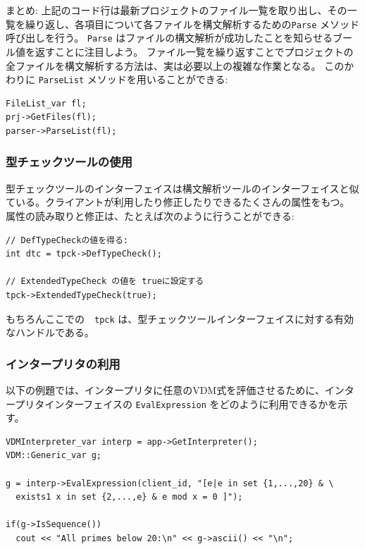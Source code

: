 \documentclass[\pformat,12pt]{jarticle}
\begin{document}
まとめ: 上記のコード行は最新プロジェクトのファイル一覧を取り出し、その一覧を繰り返し、各項目について各ファイルを構文解析するための{\tt Parse} メソッド呼び出しを行う。
 {\tt Parse} はファイルの構文解析が成功したことを知らせるブール値を返すことに注目しよう。
ファイル一覧を繰り返すことでプロジェクトの全ファイルを構文解析する方法は、実は必要以上の複雑な作業となる。
このかわりに {\tt ParseList} メソッドを用いることができる:

\begin{verbatim}
FileList_var fl;
prj->GetFiles(fl);
parser->ParseList(fl);
\end{verbatim}

\subsubsection{型チェックツールの使用}
\label{usingthetypechecker}

型チェックツールのインターフェイスは構文解析ツールのインターフェイスと似ている。クライアントが利用したり修正したりできるたくさんの属性をもつ。 
属性の読み取りと修正は、たとえば次のように行うことができる: 

\begin{verbatim}
// DefTypeCheckの値を得る:
int dtc = tpck->DefTypeCheck();

// ExtendedTypeCheck の値を trueに設定する
tpck->ExtendedTypeCheck(true);
\end{verbatim}

もちろんここでの　\texttt{tpck} は、型チェックツールインターフェイスに対する有効なハンドルである。

\subsubsection{インタープリタの利用}\label{cpp:interp}
\label{usingtheinterpreter}

以下の例題では、インタープリタに任意のVDM式を評価させるために、インタープリタインターフェイスの {\tt EvalExpression} をどのように利用できるかを示す。

\begin{verbatim}
VDMInterpreter_var interp = app->GetInterpreter();
VDM::Generic_var g;

g = interp->EvalExpression(client_id, "[e|e in set {1,...,20} & \
  exists1 x in set {2,...,e} & e mod x = 0 ]");

if(g->IsSequence())
  cout << "All primes below 20:\n" << g->ascii() << "\n";
\end{verbatim}
\end{document}
